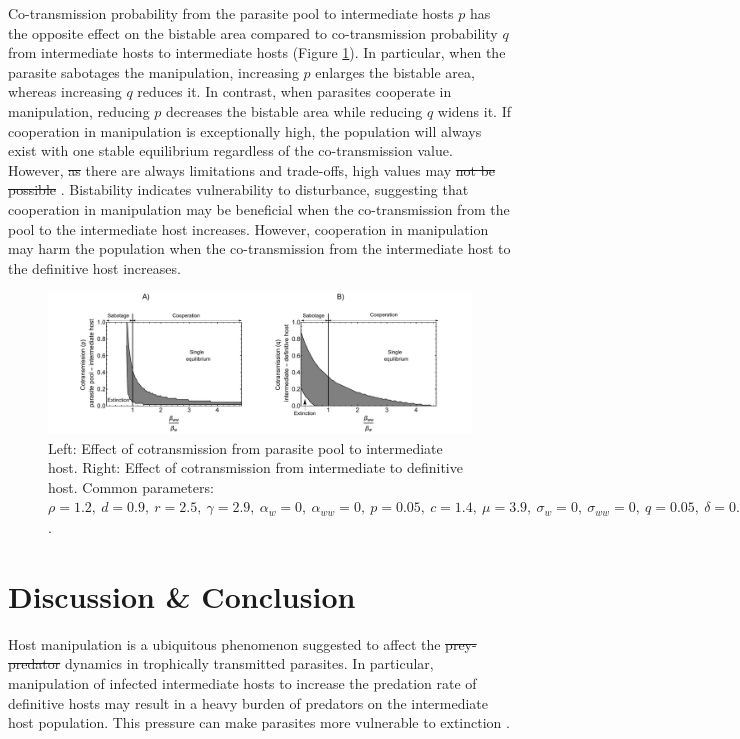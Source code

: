 \documentclass[a4paper]{scrartcl}
\providecommand{\DIFaddtex}[1]{{\protect\color{blue}\uwave{#1}}} %
\providecommand{\DIFdeltex}[1]{{\protect\color{red}\sout{#1}}}                      %
\providecommand{\DIFaddbegin}{} %
\providecommand{\DIFaddend}{} %
\providecommand{\DIFdelbegin}{} %
\providecommand{\DIFdelend}{} %
\providecommand{\DIFadd}[1]{\texorpdfstring{\DIFaddtex{#1}}{#1}} %
\providecommand{\DIFdel}[1]{\texorpdfstring{\DIFdeltex{#1}}{}} %
\newcommand{\DIFscaledelfig}{0.5}
\newlength{\DIFdelgraphicswidth} %
\newlength{\DIFdelgraphicsheight} %
\newcommand{\DIFaddincludegraphics}[2][]{{\color{blue}\fbox{\DIFOincludegraphics[#1]{#2}}}} %
\newcommand{\DIFdelincludegraphics}[2][]{%
\sbox{\DIFdelgraphicsbox}{\DIFOincludegraphics[#1]{#2}}%
\settoboxwidth{\DIFdelgraphicswidth}{\DIFdelgraphicsbox} %
\settoboxtotalheight{\DIFdelgraphicsheight}{\DIFdelgraphicsbox} %
\scalebox{\DIFscaledelfig}{%
\parbox[b]{\DIFdelgraphicswidth}{\usebox{\DIFdelgraphicsbox}\\[-\baselineskip] \rule{\DIFdelgraphicswidth}{0em}}\llap{\resizebox{\DIFdelgraphicswidth}{\DIFdelgraphicsheight}{%
\setlength{\unitlength}{\DIFdelgraphicswidth}%
\begin{picture}(1,1)%
\thicklines\linethickness{2pt} %
{\color[rgb]{1,0,0}\put(0,0){\framebox(1,1){}}}%
{\color[rgb]{1,0,0}\put(0,0){\line( 1,1){1}}}%
{\color[rgb]{1,0,0}\put(0,1){\line(1,-1){1}}}%
\end{picture}%
}\hspace*{3pt}}} %
} %
\DeclareRobustCommand{\DIFaddbegin}{\DIFOaddbegin \let\includegraphics\DIFaddincludegraphics} %
\DeclareRobustCommand{\DIFaddend}{\DIFOaddend \let\includegraphics\DIFOincludegraphics} %
\DeclareRobustCommand{\DIFdelbegin}{\DIFOdelbegin \let\includegraphics\DIFdelincludegraphics} %
\DeclareRobustCommand{\DIFdelend}{\DIFOaddend \let\includegraphics\DIFOincludegraphics} %
\begin{document}
Co-transmission probability from the parasite pool to intermediate hosts $p$ has the opposite effect on the bistable area compared to co-transmission probability $q$ from intermediate hosts to intermediate hosts (Figure \ref{fig:contransmission}). 
In particular, when the parasite sabotages the manipulation, increasing $p$ enlarges the bistable area, whereas increasing $q$ reduces it. 
In contrast, when parasites cooperate in manipulation, reducing $p$ decreases the bistable area while reducing $q$ widens it.  
If cooperation in manipulation is exceptionally high, the population will always exist with one stable equilibrium regardless of the co-transmission value.
However, \DIFdelbegin \DIFdel{as }\DIFdelend there are always limitations and trade-offs, \DIFaddbegin \DIFadd{so }\DIFaddend high values may \DIFdelbegin \DIFdel{not be possible }\DIFdelend \DIFaddbegin \DIFadd{only be possible sometimes}\DIFaddend .
Bistability indicates vulnerability to disturbance, suggesting that cooperation in manipulation may be beneficial when the co-transmission from the pool to the intermediate host increases. 
However, cooperation in manipulation may harm the population when the co-transmission from the intermediate host to the definitive host increases.

\begin{figure}[!ht]
	\captionsetup{format=plain}
	\centering
	\includegraphics[width=\textwidth]{Figures/coinfect_transmission.pdf}
	\caption{Left: Effect of cotransmission from parasite pool to intermediate host. Right: Effect of cotransmission from intermediate to definitive host. Common parameters:  $\rho = 1.2, \ d = 0.9, \ r = 2.5, \ \gamma = 2.9, \ \alpha_w = 0, \ \alpha_{ww} = 0, \ p = 0.05, \ c = 1.4, \ \mu = 3.9, \ \sigma_w = 0, \ \sigma_{ww} = 0, \ q = 0.05, \ \delta = 0.9, \ k = 0.26, \ \epsilon = 4.5, \ \beta_w = 1.45, \ f_w = 38, \ h = 0.6$.}
	\label{fig:contransmission}
\end{figure}

\section*{Discussion \& Conclusion}
Host manipulation is a ubiquitous phenomenon suggested to affect the \DIFdelbegin \DIFdel{prey-predator }\DIFdelend \DIFaddbegin \DIFadd{predator-prey }\DIFaddend dynamics in trophically transmitted parasites. 
In particular, manipulation of infected intermediate hosts to increase the predation rate of definitive hosts may result in a heavy burden of predators on the intermediate host population.
This pressure can make parasites more vulnerable to extinction \citep{Hadeler1989,Fenton2006}. 
\end{document}
